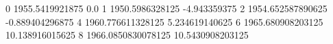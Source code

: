 0 1955.5419921875 0.0
1 1950.5986328125 -4.943359375
2 1954.652587890625 -0.889404296875
4 1960.776611328125 5.234619140625
6 1965.680908203125 10.138916015625
8 1966.0850830078125 10.5430908203125
